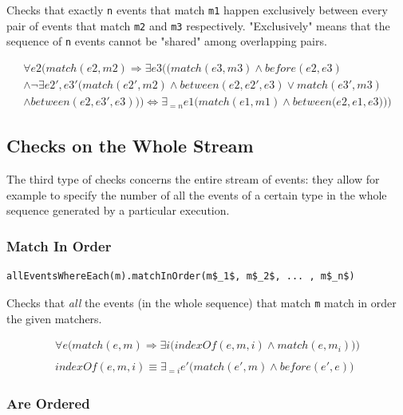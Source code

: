 \documentclass[11pt,a4paper,notitlepage]{article}
\begin{document}
Checks that exactly \texttt{n} events that match \texttt{m1} happen exclusively between every pair of events that match \texttt{m2} and \texttt{m3} respectively. "Exclusively" means that the sequence of \texttt{n} events cannot be "shared" among overlapping pairs.

\begin{multline*}
\forall e2 \Bigg( match(e2, m2) \Rightarrow \exists e3 \bigg( \Big( match(e3, m3) \land before(e2, e3) \\ \land \neg \exists e2', e3' \big( match(e2', m2) \land between(e2, e2', e3) \lor match(e3', m3) \\ \land between(e2, e3', e3) \big) \Big) \iff \exists_{=n} e1 \Big( match(e1, m1) \land between(e2, e1, e3 \Big) \bigg) \Bigg)
\end{multline*}


\subsection{Checks on the Whole Stream}

The third type of checks concerns the entire stream of events: they allow for example to specify the number of all the events of a certain type in the whole sequence generated by a particular execution.

\subsubsection{Match In Order}

\begin{lstlisting}
allEventsWhereEach(m).matchInOrder(m$_1$, m$_2$, ... , m$_n$)
\end{lstlisting}

Checks that \textit{all} the events (in the whole sequence) that match \texttt{m} match in order the given matchers.

\begin{multline*}
\forall e \bigg( match(e, m) \Rightarrow \exists i \Big( indexOf(e, m, i) \land match(e, m_i) \Big) \bigg)\\\\
indexOf(e, m, i) \equiv \exists_{=i} e' \Big( match(e', m) \land before(e', e) \Big)
\end{multline*}

\subsubsection{Are Ordered}
\end{document}
